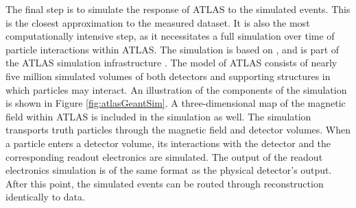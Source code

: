 The final step is to simulate the response of ATLAS to the simulated events.
This is the closest approximation to the measured dataset.
It is also the most computationally intensive step, as it necessitates a full simulation over time of particle interactions within ATLAS.
The simulation is based on \geant \cite{geant}, and is part of the ATLAS simulation infrastructure \cite{SOFT-2010-01}.
The \geant model of ATLAS consists of nearly five million simulated volumes of both detectors and supporting structures in which particles may interact.
An illustration of the components of the simulation is shown in Figure \ref{fig:atlasGeantSim}.
A three-dimensional map of the magnetic field within ATLAS is included in the simulation as well.
The simulation transports truth particles through the magnetic field and detector volumes.
When a particle enters a detector volume, its interactions with the detector and the corresponding readout electronics are simulated.
The output of the readout electronics simulation is of the same format as the physical detector's output.
After this point, the simulated events can be routed through reconstruction identically to data.

